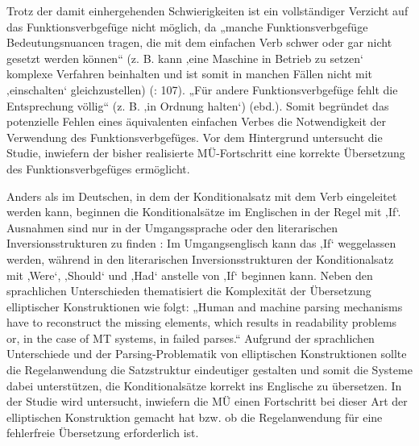 Trotz der damit einhergehenden Schwierigkeiten ist ein vollständiger Verzicht auf das Funktionsverbgefüge nicht möglich, da „manche Funktionsverbgefüge Bedeutungsnuancen tragen, die mit dem einfachen Verb schwer oder gar nicht gesetzt werden können“ (z. B. kann ‚eine Maschine in Betrieb zu setzen‘ komplexe Verfahren beinhalten und ist somit in manchen Fällen nicht mit ‚einschalten‘ gleichzustellen) (\citealt{BaumertVerhein-Jarren2012}: 107). „Für andere Funktionsverbgefüge fehlt die Entsprechung völlig“ (z. B. ‚in Ordnung halten‘) (ebd.). Somit begründet das potenzielle Fehlen eines äquivalenten einfachen Verbes die Notwendigkeit der Verwendung des Funktionsverbgefüges. Vor dem Hintergrund untersucht die Studie, inwiefern der bisher realisierte MÜ-Fortschritt eine korrekte Übersetzung des Funktionsverbgefüges ermöglicht.

Anders als im Deutschen, in dem der Konditionalsatz mit dem Verb eingeleitet werden kann, beginnen die Konditionalsätze im Englischen in der Regel mit ‚If‘. Ausnahmen sind nur in der Umgangssprache oder den literarischen Inversionsstrukturen zu finden \citep[307]{Swan1980}: Im Umgangsenglisch kann das ‚If‘ weggelassen werden, während in den literarischen Inversionsstrukturen der Konditionalsatz mit ‚Were‘, ‚Should‘ und ‚Had‘ anstelle von ‚If‘ beginnen kann. Neben den sprachlichen Unterschieden thematisiert \citet[3]{Reuther2003} die Komplexität der Übersetzung elliptischer Konstruktionen wie folgt: „Human and machine parsing mechanisms have to reconstruct the missing elements, which results in readability problems or, in the case of MT systems, in failed parses.“ Aufgrund der sprachlichen Unterschiede und der Parsing-Problematik von elliptischen Konstruktionen sollte die Regelanwendung die Satzstruktur eindeutiger gestalten und somit die Systeme dabei unterstützen, die Konditionalsätze korrekt ins Englische zu übersetzen. In der Studie wird untersucht, inwiefern die MÜ einen Fortschritt bei dieser Art der elliptischen Konstruktion gemacht hat bzw. ob die Regelanwendung für eine fehlerfreie Übersetzung erforderlich ist.

